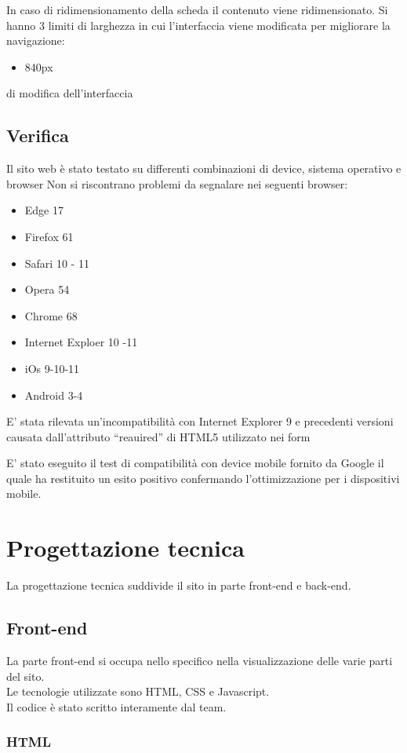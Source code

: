 In caso di ridimensionamento della scheda il contenuto viene ridimensionato.
Si hanno 3 limiti di larghezza in cui l'interfaccia viene modificata per migliorare la navigazione:
\begin{itemize}
	\item 840px
\end{itemize}di modifica dell'interfaccia

\subsection{Verifica}
Il sito web è stato testato su differenti combinazioni di device, sistema operativo e browser
Non si riscontrano problemi da segnalare nei seguenti browser:
\begin{itemize}
	\item Edge 17
	\item Firefox 61
	\item Safari 10 -  11
	\item Opera 54
	\item Chrome 68
	\item Internet Exploer 10 -11
	\item iOs 9-10-11
	\item Android 3-4
\end{itemize}

E’ stata rilevata un’incompatibilità con Internet Explorer 9 e precedenti versioni causata dall’attributo “reauired” di HTML5 utilizzato nei form

E’ stato eseguito il test di compatibilità con device mobile fornito da Google il quale ha restituito un esito positivo confermando l’ottimizzazione per i dispositivi mobile.

\section{Progettazione tecnica}
La progettazione tecnica suddivide il sito in parte front-end e back-end.
\subsection{Front-end}

La parte front-end si occupa nello specifico nella visualizzazione delle varie parti del sito.\\
Le tecnologie utilizzate sono HTML, CSS e Javascript.\\
Il codice è stato scritto interamente dal team.

\subsubsection{HTML}

